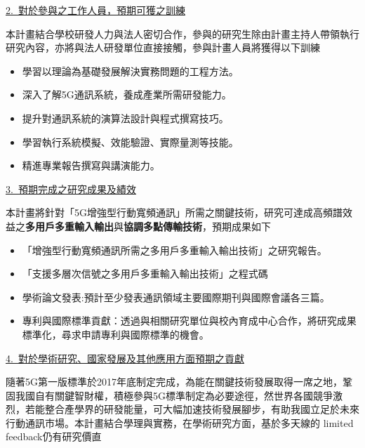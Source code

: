 \documentclass[a4paper,12pt]{article}%
\begin{document}
{\noindent \underline{2.~對於參與之工作人員，預期可獲之訓練}

本計畫結合學校研發人力與法人密切合作，參與的研究生除由計畫主持人帶領執行研究內容，亦將與法人研發單位直接接觸，參與計畫人員將獲得以下訓練

\begin{itemize}[noitemsep]
\item 學習以理論為基礎發展解決實務問題的工程方法。
\item 深入了解5G通訊系統，養成產業所需研發能力。
\item 提升對通訊系統的演算法設計與程式撰寫技巧。
\item 學習執行系統模擬、效能驗證、實際量測等技能。
\item 精進專業報告撰寫與講演能力。
\end{itemize}

\vspace{1em}%

\noindent \underline{3.~預期完成之研究成果及績效}

本計畫將針對「5G增強型行動寬頻通訊」所需之關鍵技術，研究可達成高頻譜效益之\textbf{多用戶多重輸入輸出}與\textbf{協調多點傳輸技術}，預期成果如下
\begin{itemize}[noitemsep]
 \item 「增強型行動寬頻通訊所需之多用戶多重輸入輸出技術」之研究報告。
 \item 「支援多層次信號之多用戶多重輸入輸出技術」之程式碼
 \item 學術論文發表:預計至少發表通訊領域主要國際期刊與國際會議各三篇。
 \item 專利與國際標準貢獻：透過與相關研究單位與校內育成中心合作，將研究成果標準化，尋求申請專利與國際標準的機會。
\end{itemize}


\vspace{1em}%
\noindent \underline{4.~對於學術研究、國家發展及其他應用方面預期之貢獻}

隨著5G第一版標準於2017年底制定完成，為能在關鍵技術發展取得一席之地，鞏固我國自有關鍵智財權，積極參與5G標準制定為必要途徑，然世界各國競爭激烈，若能整合產學界的研發能量，可大幅加速技術發展腳步，有助我國立足於未來行動通訊市場。本計畫結合學理與實務，在學術研究方面，基於多天線的 limited feedback仍有研究價直

}
\end{document}
